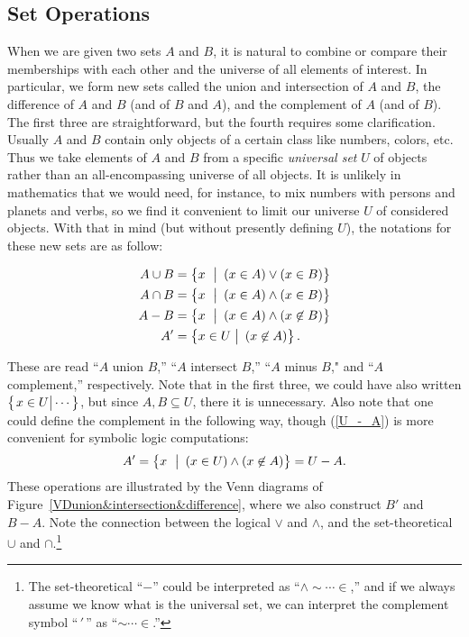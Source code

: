 \subsection{Set Operations}
When we are given two sets $A$ and $B$, it is natural to 
combine or compare their memberships with each other and the universe
of all elements of interest. 
In particular, we form new sets called the union and intersection of
$A$ and $B$, the difference of $A$ and $B$ (and of $B$ and $A$), 
and the complement
of $A$ (and  of $B$). 
The first three are straightforward, but the
fourth requires some clarification.  Usually $A$ and
$B$ contain only objects of a certain class like
numbers, colors, etc.  Thus we take elements of $A$ and
$B$ from a specific {\it universal set} $U$ of objects rather
than an all-encompassing universe of all objects.  It is  
unlikely in mathematics that we
would need, for instance, to mix numbers with persons and
planets and verbs, so we find it convenient to 
limit our universe $U$ of considered objects.
With that in mind (but without presently defining $U$),  
the notations for these new sets are as follow:
\begin{definition}
\begin{align}
A\cup B&=\left\{x\ \left.\vphantom{x_0^9}\right|\  
(x\in A)\vee(x\in B)\right\}\label{A_union_B}\\
A\cap B&=\left\{x\ \left.\vphantom{x_0^9}\right|\
(x\in A)\wedge(x\in B)\right\}\\
A-B&=\left\{x\ \left.\vphantom{x_0^9}\right|\
(x\in A)\wedge(x\not\in B)\right\}\\
A'&=\left\{x\in U \left.\vphantom{x_0^9}\right|\
(x\not\in A)\right\}.\label{U_-_A} 
\end{align}
\end{definition} 
These are read ``$A$ union $B$,''  ``$A$ intersect $B$,'' 
``$A$ minus $B$," and ``$A$ complement,'' respectively.  
Note that in the first three, we could have also written
$\left\{\left.x\in U\vphantom{\frac11}\right|\cdots\right\}$, 
but since $A,B\subseteq U$, there it is unnecessary.
Also note that one could define the complement in the following way,
though (\ref{U_-_A}) is more convenient for symbolic logic
computations:
\begin{equation}A'=\left\{x\ \left.\vphantom{x_0^9}\right|\
(x\in U)\wedge(x\not\in A)\right\}=U-A.\label{U_-_A--2}\end{equation}
These operations are illustrated
by the Venn diagrams of 
Figure~\ref{VDunion&intersection&difference}, where we
also construct $B'$ and  $B-A$.  Note the connection between
the logical $\vee$ and $\wedge$, and the set-theoretical
$\cup$ and $\cap$.\footnote{%
The set-theoretical ``$-$'' could be interpreted as ``$\wedge\sim\cdots\in$,''
and if we always assume we know what is the universal set, we
can interpret the complement symbol ``$\,'\,$'' as ``$\sim\cdots\in$.''}




